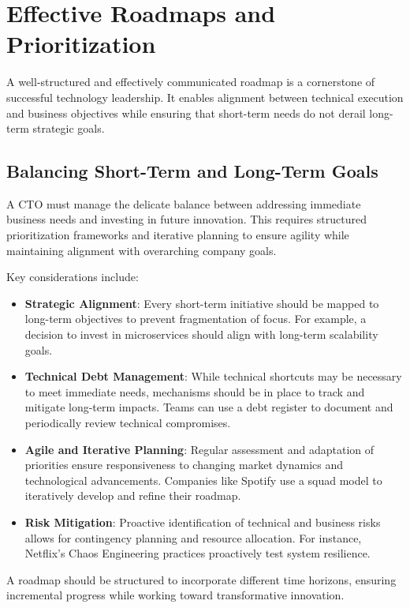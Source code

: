 \section{Effective Roadmaps and Prioritization}

A well-structured and effectively communicated roadmap is a cornerstone of successful technology leadership. It enables alignment between technical execution and business objectives while ensuring that short-term needs do not derail long-term strategic goals.

\subsection{Balancing Short-Term and Long-Term Goals}
A CTO must manage the delicate balance between addressing immediate business needs and investing in future innovation. This requires structured prioritization frameworks and iterative planning to ensure agility while maintaining alignment with overarching company goals.

Key considerations include:

\begin{itemize}
    \item \textbf{Strategic Alignment}: Every short-term initiative should be mapped to long-term objectives to prevent fragmentation of focus. For example, a decision to invest in microservices should align with long-term scalability goals.
    \item \textbf{Technical Debt Management}: While technical shortcuts may be necessary to meet immediate needs, mechanisms should be in place to track and mitigate long-term impacts. Teams can use a debt register to document and periodically review technical compromises.
    \item \textbf{Agile and Iterative Planning}: Regular assessment and adaptation of priorities ensure responsiveness to changing market dynamics and technological advancements. Companies like Spotify use a squad model to iteratively develop and refine their roadmap.
    \item \textbf{Risk Mitigation}: Proactive identification of technical and business risks allows for contingency planning and resource allocation. For instance, Netflix's Chaos Engineering practices proactively test system resilience.
\end{itemize}

A roadmap should be structured to incorporate different time horizons, ensuring incremental progress while working toward transformative innovation.


